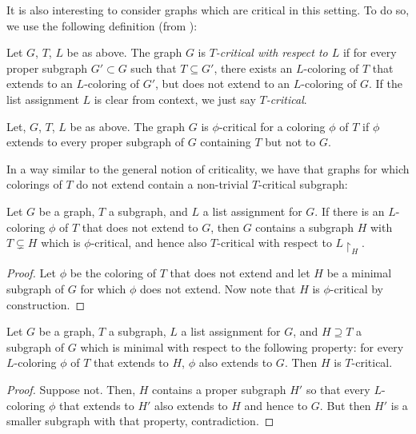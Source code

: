 It is also interesting to consider graphs which are critical in this setting. To do so, we use the following definition (from \cite{fivelistcoloring2}):

\begin{definition}[$T$-critical]
	Let $G$, $T$, $L$ be as above. The graph $G$ is \emph{$T$-critical with respect to $L$} if for every proper subgraph $G' \subset G$ such that $T \subseteq G'$, there exists an $L$-coloring of $T$ that extends to an $L$-coloring of $G'$, but does not extend to an $L$-coloring of $G$. If the list assignment $L$ is clear from context, we just say \emph{$T$-critical}.
\end{definition}

\begin{definition}
	Let, $G$, $T$, $L$ be as above. The graph $G$ is $\phi$-critical for a coloring $\phi$ of $T$ if $\phi$ extends to every proper subgraph of $G$ containing $T$ but not to $G$.
\end{definition}

In a way similar to the general notion of criticality, we have that graphs for which colorings of $T$ do not extend contain a non-trivial $T$-critical subgraph:

\begin{lemma}
Let $G$ be a graph, $T$ a subgraph, and $L$ a list assignment for $G$. If there 
is an $L$-coloring $\phi$ of $T$ that does not extend to $G$, 
then $G$ contains a subgraph $H$ with $T \subsetneq H$ which 
is $\phi$-critical, and hence also $T$-critical with respect 
to $L\restriction_H$. 
\end{lemma}

\begin{proof}
Let $\phi$ be the coloring of $T$ that does not extend and let $H$ be a minimal subgraph 
of $G$ for which $\phi$ does not extend. Now note that $H$ is $\phi$-critical 
by construction.
\end{proof}

\begin{lemma}
\label{minimalsubgraphlemma}
Let $G$ be a graph, $T$ a subgraph, $L$ a list assignment for $G$, and $H \supseteq T$ 
a subgraph of $G$ which is minimal with respect to the following property: 
for every $L$-coloring $\phi$ of $T$ that extends to $H$, $\phi$ also extends to $G$. 
Then $H$ is $T$-critical.
\end{lemma}

\begin{proof}
Suppose not. Then, $H$ contains a proper subgraph $H'$ so that every $L$-coloring $\phi$ that extends to $H'$ also extends to $H$ and hence to $G$. But then $H'$ is a smaller subgraph with that property, contradiction. 
\end{proof}

